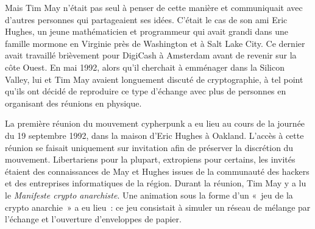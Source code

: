 Mais Tim May n'était pas seul à penser de cette manière et communiquait avec d'autres personnes qui partageaient ses idées. C'était le cas de son ami Eric Hughes, un jeune mathématicien et programmeur qui avait grandi dans une famille mormone en Virginie près de Washington et à Salt Lake City. Ce dernier avait travaillé brièvement pour DigiCash à Amsterdam avant de revenir sur la côte Ouest. En mai 1992, alors qu'il cherchait à emménager dans la Silicon Valley, lui et Tim May avaient longuement discuté de cryptographie, à tel point qu'ils ont décidé de reproduire ce type d'échange avec plus de personnes en organisant des réunions en physique. %

La première réunion du mouvement cypherpunk a eu lieu au cours de la journée du 19 septembre 1992, dans la maison d'Eric Hughes à Oakland. L'accès à cette réunion se faisait uniquement sur invitation afin de préserver la discrétion du mouvement. Libertariens pour la plupart, extropiens pour certains, les invités étaient des connaissances de May et Hughes issues de la communauté des hackers et des entreprises informatiques de la région. Durant la réunion, Tim May y a lu le \emph{Manifeste crypto anarchiste}. Une animation sous la forme d'un «~jeu de la crypto anarchie~» a eu lieu~: ce jeu consistait à simuler un réseau de mélange par l'échange et l'ouverture d'enveloppes de papier.

